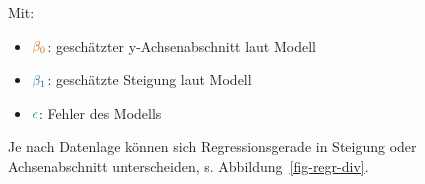 \documentclass[
  a4paper,
]{scrbook}
\providecommand{\tightlist}{%
  \setlength{\itemsep}{0pt}\setlength{\parskip}{0pt}}\usepackage{longtable,booktabs,array}
\theoremstyle{definition}
\theoremstyle{definition}
\theoremstyle{definition}
\theoremstyle{remark}
\begin{document}
Mit:

\begin{itemize}
\tightlist
\item
  \(\color{beta0col}{\beta_0}\): geschätzter y-Achsenabschnitt laut
  Modell
\item
  \(\color{beta1col}{\beta_1}\): geschätzte Steigung laut Modell
\item
  \(\color{errorcol}{\epsilon}\): Fehler des Modells
\end{itemize}

Je nach Datenlage können sich Regressionsgerade in Steigung oder
Achsenabschnitt unterscheiden, s. Abbildung~\ref{fig-regr-div}.

\begin{figure}

\begin{minipage}{0.50\linewidth}



\end{minipage}%
%
\begin{minipage}{0.50\linewidth}

\end{minipage}
\end{figure}
\end{document}
